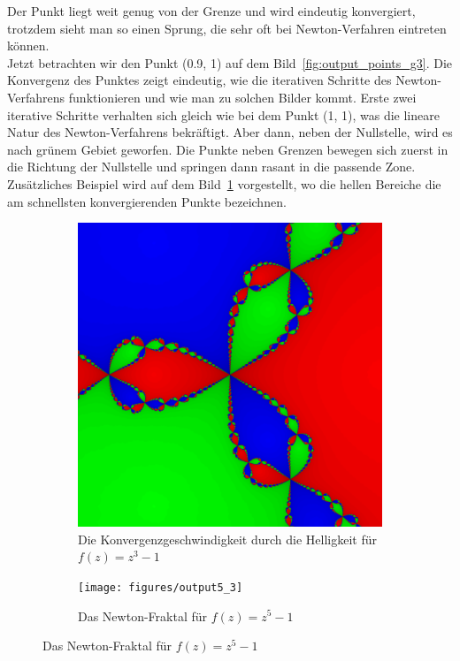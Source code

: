 \documentclass[a4paper,12pt]{llncs}
\makeatletter
\newcommand\nocaption{%
	\renewcommand\p@subfigure{}
	\renewcommand\thesubfigure{\thefigure\alph{subfigure}}
}
\numberwithin{equation}{section}
\makeatother
\begin{document}
Der Punkt liegt weit genug von der Grenze und wird eindeutig konvergiert, trotzdem sieht man so einen Sprung, die sehr oft bei Newton-Verfahren eintreten können.\\
Jetzt betrachten wir den Punkt (0.9, 1) auf dem Bild~\ref{fig:output_points_g3}.
Die Konvergenz des Punktes zeigt eindeutig, wie die iterativen Schritte des Newton-Verfahrens funktionieren und wie man zu solchen Bilder kommt. 
Erste zwei iterative Schritte verhalten sich gleich wie bei dem Punkt (1, 1), was die lineare Natur des Newton-Verfahrens bekräftigt. 
Aber dann, neben der Nullstelle, wird es nach grünem Gebiet geworfen.
Die Punkte neben Grenzen bewegen sich zuerst in die Richtung der Nullstelle und springen dann rasant in die passende Zone.\\
Zusätzliches Beispiel wird auf dem Bild~\ref{fig:output3_3} vorgestellt, wo die hellen Bereiche die am schnellsten konvergierenden Punkte bezeichnen.
\begin{figure}[ht]   
	\nocaption
	\begin{subfigure}{.5\textwidth}
	\centering
		\includegraphics[width=.7\linewidth]{figures/output3_3}
		\captionsetup{width=0.8\textwidth}
		\caption{Die Konvergenzgeschwindigkeit durch die Helligkeit für $f(z)=z^3-1$ }
		\label{fig:output3_3}
	\end{subfigure}%
	\begin{subfigure}{.5\textwidth}
	\centering
		\texttt{[image: figures/output5\_3]}
		\captionsetup{width=0.8\textwidth}
		\caption{Das Newton-Fraktal für $f(z)=z^5-1$ }
		\label{fig:output5_3}
	\end{subfigure}%
\end{figure}
\end{document}

